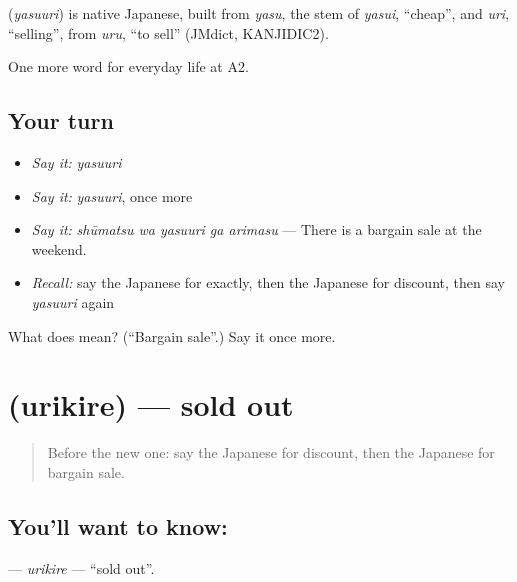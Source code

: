 \begin{cousinweb}
\textbf{} (\emph{yasuuri}) is native Japanese, built from \emph{yasu}, the stem of \emph{yasui}, \textquotedblleft{}cheap\textquotedblright{}, and \emph{uri}, \textquotedblleft{}selling\textquotedblright{}, from \emph{uru}, \textquotedblleft{}to sell\textquotedblright{} (JMdict, KANJIDIC2).
\end{cousinweb}

\begin{grammarlens}[title={What you've built}]
One more word for everyday life at A2.
\end{grammarlens}

\subsection*{Your turn}
\begin{itemize}
\raggedright
  \item \emph{Say it:} \emph{yasuuri}
  \item \emph{Say it:} \emph{yasuuri}, once more
  \item \emph{Say it:} \emph{shūmatsu wa yasuuri ga arimasu} — There is a bargain sale at the weekend.
  \item \emph{Recall:} say the Japanese for exactly, then the Japanese for discount, then say \emph{yasuuri} again
\end{itemize}

\begin{tcolorbox}[breakable,colback=teal!4,colframe=teal!35!black,title={Before you move on}]
What does  mean? (\textquotedblleft{}Bargain sale\textquotedblright{}.) Say it once more.
\end{tcolorbox}
\section[\texorpdfstring{\ja{うりきれ} (urikire)}{うりきれ (urikire)}]{ (urikire) — sold out}

\label{lesson:JA-C185-urikire}



\begin{quote}
Before the new one: say the Japanese for discount, then the Japanese for bargain sale.
\end{quote}

\subsection*{You'll want to know: }
\textbf{} — \emph{urikire} — \textquotedblleft{}sold out\textquotedblright{}.

